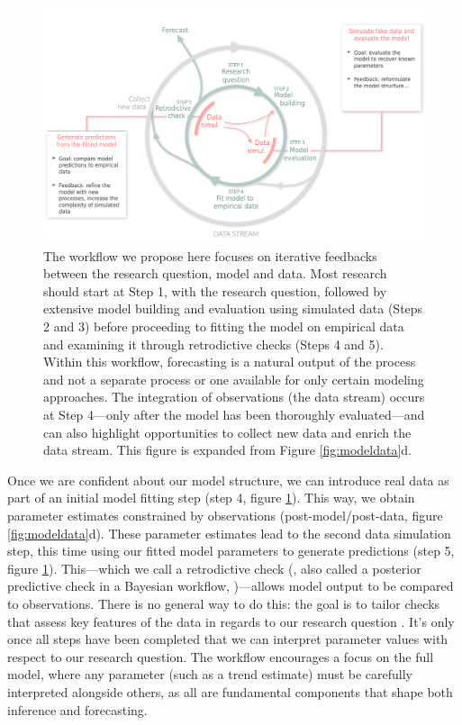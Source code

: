 \documentclass[11pt]{article}
\newcommand{\llabel}[1]{\hypertarget{lintarget:#1}{}\linelabel{lin:#1}}
\begin{document}
\begin{figure}[h]
	\centering
	\vspace*{-0.5cm}
    \hspace*{-1.5cm}
	\includegraphics{../figures/figure_worflow_wsteps}
	\caption{The workflow we propose here \citep[which builds from recent advances in workflows,][]{betanworkflow,Gelman2020,Schad2020,grinsztajn2021,vandeschoot2021,Wolkovich2024} focuses on iterative feedbacks between the research question, model and data. Most research should start at Step 1, with the research question, followed by extensive model building and evaluation using simulated data (Steps 2 and 3) before proceeding to fitting the model on empirical data and examining it through retrodictive checks (Steps 4 and 5). Within this workflow, forecasting is a natural output of the process and not a separate process or one available for only certain modeling approaches.  The integration of observations (the data stream) occurs at Step 4---only after the model has been thoroughly evaluated---and can also highlight opportunities to collect new data and enrich the data stream. This figure is expanded from Figure \ref{fig:modeldata}d.}
	\vspace*{-0cm}
	\label{fig:workflow}
\end{figure}

Once we are confident about our model structure, we can introduce real data as part of an initial model fitting step (step 4, figure \ref{fig:workflow}). This way, we obtain parameter estimates constrained by observations (\llabel{quad7}post-model/post-data, figure \ref{fig:modeldata}d). 
These parameter estimates lead to the second data simulation step, this time using our fitted model parameters to generate predictions (step 5, figure \ref{fig:workflow}). This---which we call a retrodictive check (\citealp{betanworkflow}, also called a \llabel{PPC}posterior predictive check in a Bayesian workflow,  \citealp{Gelman2020})---allows model output to be compared to observations. \llabel{howtoPPC}There is no general way to do this: the goal is to tailor checks that assess key features of the data in regards to our research question \citep{Gelman2020}.
It's only once all steps have been completed that we can interpret parameter values with respect to our research question.
The workflow encourages a focus on the full model, where any parameter (such as a trend estimate) must be carefully interpreted alongside others, as all are fundamental components that shape both inference and forecasting. 
\end{document}
